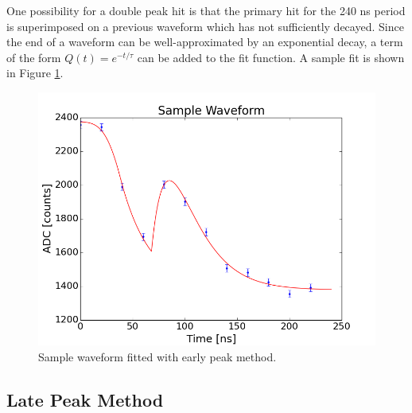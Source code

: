  One possibility for a double peak hit is that the primary hit for the 240 ns period is superimposed on a previous waveform which has not sufficiently decayed. Since the end of a waveform can be well-approximated by an exponential decay, a term of the form $Q(t) = e^{-t / \tau}$ can be added to the fit function. A sample fit is shown in Figure \ref{fig:earlyPeak}.


\begin{figure}[htp!]
    \centering
    \includegraphics[scale=0.6]{Images2/dynamicPed.png}
    \caption{Sample waveform fitted with early peak method.}
    \label{fig:earlyPeak}
\end{figure} 



\subsection{Late Peak Method}


